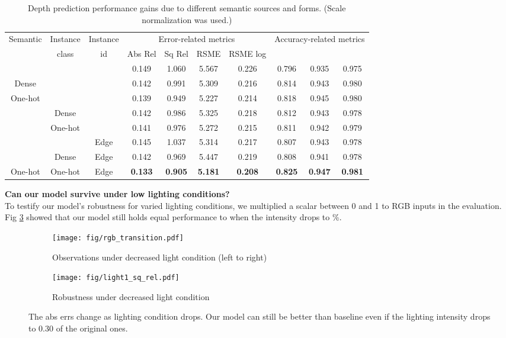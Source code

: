 \documentclass[10pt,twocolumn]{article}
\newcommand{\Noindent}{\vspace{2pt} \noindent}
\newcommand{\parquest}[1]{\Noindent\textbf{#1?\\}}
\begin{document}
\begin{table*}[htbp]
\centering
\begin{tabular}{ c c c|| c c c c|c c c  }
 \hline
  \multirow{2}{*}{Semantic} &  Instance & Instance & \multicolumn{4}{c|}{Error-related metrics} & \multicolumn{3}{c}{Accuracy-related metrics}\\
  
   &  class & id  & Abs Rel & Sq Rel & RSME & RSME log &  &  & \\
   
 \hline
  &  & & 0.149 &    1.060 &    5.567    & 0.226 & 0.796 & 0.935 & 0.975\\
  Dense &  &  & 0.142 & 0.991 & 5.309 & 0.216 & 0.814 & 0.943 & 0.980\\

  One-hot &  &  & 0.139& 0.949 & 5.227 & 0.214 & 0.818 & 0.945 & 0.980 \\

   & Dense &  & 0.142 & 0.986 & 5.325 & 0.218 & 0.812 & 0.943 & 0.978 \\

   & One-hot &  & 0.141 & 0.976 & 5.272 & 0.215 & 0.811 & 0.942 & 0.979 \\

   &  & Edge & 0.145 & 1.037 & 5.314 & 0.217 & 0.807 & 0.943 & 0.978 \\
   & Dense & Edge & 0.142 & 0.969 & 5.447 & 0.219 & 0.808 & 0.941 & 0.978 \\
  One-hot & One-hot & Edge &  \textbf{0.133} &     \textbf{0.905} &     \textbf{5.181} &     \textbf{0.208} &     \textbf{0.825} &     \textbf{0.947} &     \textbf{0.981} \\
 \hline
\end{tabular}
\caption{Depth prediction performance gains due to different semantic sources and forms. (Scale normalization was used.)}\label{tab:source}
\end{table*}

\parquest{Can our model survive under low lighting conditions}
To testify our model's robustness for varied lighting conditions, we multiplied a scalar between 0 and 1 to RGB inputs in the evaluation. Fig \ref{fig:darkness} showed that our model still holds equal performance to \cite{yin2018geonet} when the intensity drops to \%.

\begin{figure}[!htbp]
    \centering
         \begin{subfigure}[b]{1\linewidth}
       \texttt{[image: fig/rgb\_transition.pdf]}
       \caption{Observations under decreased light condition (left to right)}
       \label{subfig-4:rgb-trans}
     \end{subfigure}
     \begin{subfigure}[b]{1\linewidth}
       \texttt{[image: fig/light1\_sq\_rel.pdf]}
       \caption{Robustness under decreased light condition}
       \label{subfig-4:noise-test}
     \end{subfigure}
    \caption{The abs errs change as lighting condition drops. Our model can still be better than baseline even if the lighting intensity drops to 0.30 of the original ones.}
    \label{fig:darkness}
\end{figure}
\end{document}
